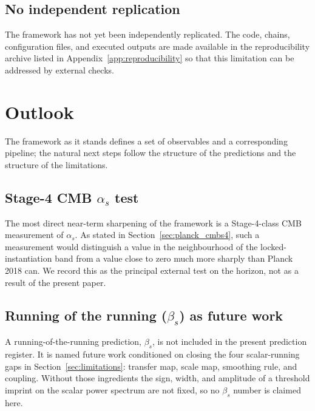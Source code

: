 ﻿\documentclass[12pt,a4paper]{article}
\theoremstyle{definition}
\begin{document}
\subsection{No independent replication}

The framework has not yet been independently replicated. The code, chains, configuration files, and executed outputs are made available in the reproducibility archive listed in Appendix~\ref{app:reproducibility} so that this limitation can be addressed by external checks.

\section{Outlook}
\label{sec:outlook}

The framework as it stands defines a set of observables and a corresponding pipeline; the natural next steps follow the structure of the predictions and the structure of the limitations.

\subsection[Stage-4 CMB alpha s test]{Stage-4 CMB $\alpha_s$ test}
\label{sec:outlook_cmbs4}

The most direct near-term sharpening of the framework is a Stage-4-class CMB measurement of $\alpha_s$. As stated in Section~\ref{sec:planck_cmbs4}, such a measurement would distinguish a value in the neighbourhood of the locked-instantiation band from a value close to zero much more sharply than Planck 2018 can. We record this as the principal external test on the horizon, not as a result of the present paper.

\subsection[Running of the running as future work]{Running of the running ($\beta_s$) as future work}
\label{sec:outlook_beta_s}

A running-of-the-running prediction, $\beta_s$, is not included in the present prediction register. It is named future work conditioned on closing the four scalar-running gaps in Section~\ref{sec:limitations}: transfer map, scale map, smoothing rule, and coupling. Without those ingredients the sign, width, and amplitude of a threshold imprint on the scalar power spectrum are not fixed, so no $\beta_s$ number is claimed here.
\end{document}
